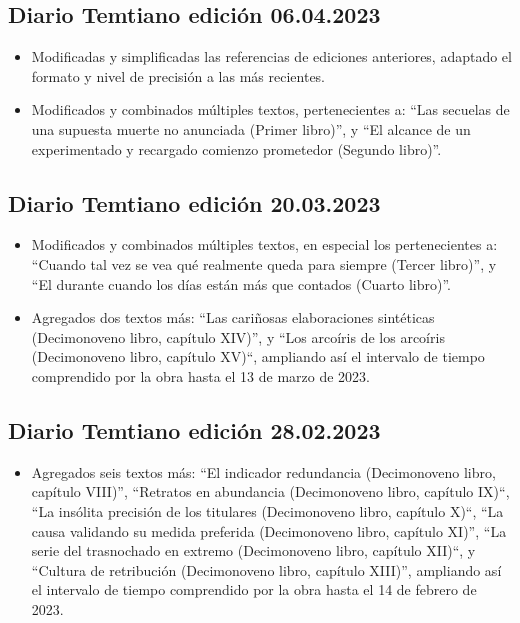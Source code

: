 \documentclass[
]{book}
\providecommand{\tightlist}{%
  \setlength{\itemsep}{0pt}\setlength{\parskip}{0pt}}
\begin{document}
\hypertarget{diario-temtiano-ediciuxf3n-06.04.2023}{%
\subsection*{Diario Temtiano edición 06.04.2023}\label{diario-temtiano-ediciuxf3n-06.04.2023}}

\begin{itemize}
\item
  Modificadas y simplificadas las referencias de ediciones anteriores, adaptado el formato y nivel de precisión a las más recientes.
\item
  Modificados y combinados múltiples textos, pertenecientes a: ``Las secuelas de una supuesta muerte no anunciada (Primer libro)'', y ``El alcance de un experimentado y recargado comienzo prometedor (Segundo libro)''.
\end{itemize}

\hypertarget{diario-temtiano-ediciuxf3n-20.03.2023}{%
\subsection*{Diario Temtiano edición 20.03.2023}\label{diario-temtiano-ediciuxf3n-20.03.2023}}

\begin{itemize}
\item
  Modificados y combinados múltiples textos, en especial los pertenecientes a: ``Cuando tal vez se vea qué realmente queda para siempre (Tercer libro)'', y ``El durante cuando los días están más que contados (Cuarto libro)''.
\item
  Agregados dos textos más: ``Las cariñosas elaboraciones sintéticas (Decimonoveno libro, capítulo XIV)'', y ``Los arcoíris de los arcoíris (Decimonoveno libro, capítulo XV)``, ampliando así el intervalo de tiempo comprendido por la obra hasta el 13 de marzo de 2023.
\end{itemize}

\hypertarget{diario-temtiano-ediciuxf3n-28.02.2023}{%
\subsection*{Diario Temtiano edición 28.02.2023}\label{diario-temtiano-ediciuxf3n-28.02.2023}}

\begin{itemize}
\tightlist
\item
  Agregados seis textos más: ``El indicador redundancia (Decimonoveno libro, capítulo VIII)'', ``Retratos en abundancia (Decimonoveno libro, capítulo IX)``, ``La insólita precisión de los titulares (Decimonoveno libro, capítulo X)``, ``La causa validando su medida preferida (Decimonoveno libro, capítulo XI)'', ``La serie del trasnochado en extremo (Decimonoveno libro, capítulo XII)``, y ``Cultura de retribución (Decimonoveno libro, capítulo XIII)'', ampliando así el intervalo de tiempo comprendido por la obra hasta el 14 de febrero de 2023.
\end{itemize}
\end{document}
